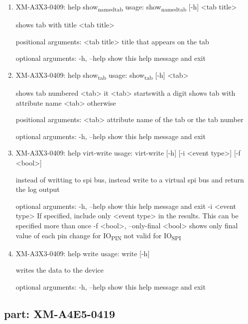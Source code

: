 \documentclass[11pt]{article}
\begin{document}
\begin{enumerate}
\item XM-A3X3-0409: help show\textsubscript{named}\textsubscript{tab}
\label{sec:orge9e8e94}
usage: show\textsubscript{named}\textsubscript{tab} [-h] <tab title>

shows tab with title <tab title>

positional arguments:
  <tab title>  title that appears on the tab

optional arguments:
  -h, --help   show this help message and exit

\item XM-A3X3-0409: help show\textsubscript{tab}
\label{sec:org4bc213b}
usage: show\textsubscript{tab} [-h] <tab>

shows tab numbered <tab> it <tab> startswith a digit shows tab with attribute
name <tab> otherwise

positional arguments:
  <tab>       attribute name of the tab or the tab number

optional arguments:
  -h, --help  show this help message and exit

\item XM-A3X3-0409: help virt-write
\label{sec:orgefff56a}
usage: virt-write [-h] [-i <event type>] [-f <bool>]

instead of writting to spi bus, instead write to a virtual spi bus and return
the log output

optional arguments:
  -h, --help            show this help message and exit
  -i <event type>       If specified, include only <event type> in the
                        results. This can be specified more than once
  -f <bool>, --only-final <bool>
                        shows only final value of each pin change for IO\textsubscript{PIN}
                        not valid for IO\textsubscript{SPI}

\item XM-A3X3-0409: help write
\label{sec:org9b53db7}
usage: write [-h]

writes the data to the device

optional arguments:
  -h, --help  show this help message and exit
\end{enumerate}

\subsection{part: XM-A4E5-0419}
\label{sec:orgc723e3e}
\end{document}
